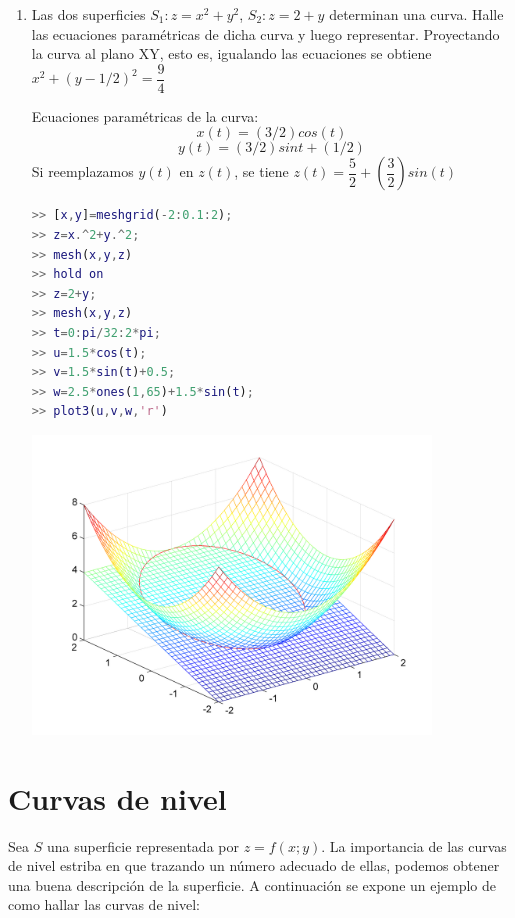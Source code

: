 \begin{enumerate}
\item Las dos superficies $S_{1} : z=x^{2}+y^{2}$, $S_{2} : z=2+y$ determinan una curva. Halle las ecuaciones paramétricas de dicha curva y luego representar. Proyectando la curva al plano XY, esto es, igualando las ecuaciones se obtiene $x^{2} + (y-1/2)^{2} = \dfrac{9}{4}$

Ecuaciones paramétricas de la curva:
$$ x(t) = (3/2)cos(t) $$
$$ y(t) = (3/2)sin t+(1/2) $$
Si reemplazamos $y(t)$ en $z(t)$, se tiene $z(t)=\dfrac{5}{2}+(\dfrac{3}{2})sin(t) $

\begin{lstlisting}[language=Matlab]
>> [x,y]=meshgrid(-2:0.1:2);
>> z=x.^2+y.^2;
>> mesh(x,y,z)
>> hold on
>> z=2+y;
>> mesh(x,y,z)
>> t=0:pi/32:2*pi;
>> u=1.5*cos(t);
>> v=1.5*sin(t)+0.5;
>> w=2.5*ones(1,65)+1.5*sin(t);
>> plot3(u,v,w,'r')
\end{lstlisting}
\includegraphics[width=300pt]{./Imagenes/superficies4.png}

\end{enumerate} 

\section{Curvas de nivel}

Sea $S$ una superficie representada por $z=f(x;y)$. La importancia de las curvas de nivel estriba en que trazando un número adecuado de ellas, podemos obtener una buena descripción de la superficie. A continuación se expone un ejemplo de como hallar las curvas de nivel:

